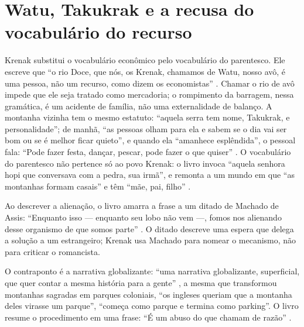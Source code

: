 \documentclass[12pt]{article}
\begin{document}
\section{Watu, Takukrak e a recusa do vocabulário do recurso}

Krenak substitui o vocabulário econômico pelo vocabulário do parentesco. Ele escreve que ``o rio Doce, que nós, os Krenak, chamamos de Watu, nosso avô, é uma pessoa, não um recurso, como dizem os economistas'' \cite[p. 40]{krenak2019}. Chamar o rio de avô impede que ele seja tratado como mercadoria; o rompimento da barragem, nessa gramática, é um acidente de família, não uma externalidade de balanço. A montanha vizinha tem o mesmo estatuto: ``aquela serra tem nome, Takukrak, e personalidade''; de manhã, ``as pessoas olham para ela e sabem se o dia vai ser bom ou se é melhor ficar quieto'', e quando ela ``amanhece esplêndida'', o pessoal fala: ``Pode fazer festa, dançar, pescar, pode fazer o que quiser'' \cite[p. 18]{krenak2019}. O vocabulário do parentesco não pertence só ao povo Krenak: o livro invoca ``aquela senhora hopi que conversava com a pedra, sua irmã'', e remonta a um mundo em que ``as montanhas formam casais'' e têm ``mãe, pai, filho'' \cite[p. 18]{krenak2019}.

Ao descrever a alienação, o livro amarra a frase a um ditado de Machado de Assis: ``Enquanto isso --- enquanto seu lobo não vem ---, fomos nos alienando desse organismo de que somos parte'' \cite[p. 16]{krenak2019}. O ditado descreve uma espera que delega a solução a um estrangeiro; Krenak usa Machado para nomear o mecanismo, não para criticar o romancista.

O contraponto é a narrativa globalizante: ``uma narrativa globalizante, superficial, que quer contar a mesma história para a gente'' \cite[p. 19]{krenak2019}, a mesma que transformou montanhas sagradas em parques coloniais, ``os ingleses queriam que a montanha deles virasse um parque'', ``começa como parque e termina como parking''. O livro resume o procedimento em uma frase: ``É um abuso do que chamam de razão'' \cite[p. 19]{krenak2019}.
\end{document}
